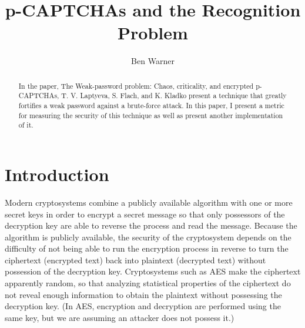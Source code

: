 \documentclass[12pt]{article}
\begin{document}
\title{p-CAPTCHAs and the Recognition Problem}
\author{Ben Warner}
\maketitle


% 

\begin{abstract}
In the paper, The Weak-password problem: Chaos, criticality, and encrypted p-CAPTCHAs, T. V. Laptyeva, S. Flach, and K. Kladko present a technique that greatly fortifies a weak password against a brute-force attack. In this paper, I present a metric for measuring the security of this technique as well as present another implementation of it.
\end{abstract}

\section*{Introduction}
	Modern cryptosystems combine a publicly available algorithm with one or more secret keys in order to encrypt a secret message so that only possessors of the decryption key are able to reverse the process and read the message. Because the algorithm is publicly available, the security of the cryptosystem depends on the difficulty of not being able to run the encryption process in reverse to turn the ciphertext (encrypted text) back into plaintext (decrypted text) without possession of the decryption key. Cryptosystems such as AES make the ciphertext apparently random, so that analyzing statistical properties of the ciphertext do not reveal enough information to obtain the plaintext without possessing the decryption key. (In AES, encryption and decryption are performed using the same key, but we are assuming an attacker does not possess it.)
\end{document}
